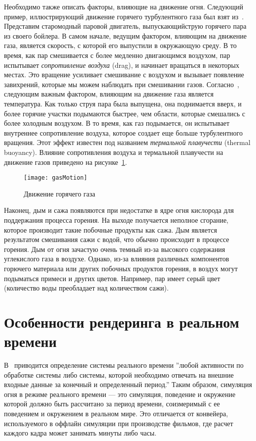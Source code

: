 Необходимо также описать факторы, влияющие на движение огня. Следующий пример,
иллюстрирующий движение горячего турбулентного газа был взят
из~\cite{Foster1997ModelingTM}. Представим старомодный паровой двигатель,
выпускающий\break{}струю горячего пара из своего бойлера. В самом начале,
ведущим фактором, влияющим на движение газа, является скорость, с которой его
выпустили в окружающую среду. В то время, как пар смешивается с более медленно
двигающимся воздухом, пар испытывает \emph{сопротивление воздуха} (drag), и
начинает вращаться в некоторых местах. Это вращение усиливает смешивание с
воздухом и вызывает появление завихрений, которые мы можем наблюдать при
смешивании газов.  Согласно~\cite{Foster1997ModelingTM}, следующим важным
фактором, влияющим на движение газа является температура. Как только струя пара
была выпущена, она поднимается вверх, и более горячие участки подымаются
быстрее, чем области, которые смешались с более холодным воздухом. В то время,
как газ подымается, он испытывает внутреннее сопротивление воздуха, которое
создает еще больше турбулентного вращения. Этот эффект известен под названием
\emph{термальной плавучести} (thermal buoyancy). Влияние сопротивления воздуха и
термальной плавучести на движение газов приведено на
рисунке~\ref{fig:gasMotion}.
\begin{figure}[htb]
	\centering
    \texttt{[image: gasMotion]}
	\caption{Движение горячего газа}%
    \label{fig:gasMotion}
\end{figure}

Наконец, дым и сажа появляются при недостатке в ядре огня кислорода для
поддержания процесса горения. На выходе получается неполное сгорание, которое
производит такие побочные продукты как сажа. Дым является результатом смешивания
сажи с водой, что обычно происходит в процессе горения. Дым от огня зачастую
очень темный из-за высокого содержания углекислого газа в воздухе. Однако, из-за
влияния различных компонентов горючего материала или других побочных продуктов
горения, в воздух могут подыматься примеси и других цветов. Например, пар имеет
серый цвет (количество воды преобладает над количеством сажи).

\section{Особенности рендеринга в реальном времени}

В~\cite{Young1982RealTL} приводится определение системы реального времени
''любой активности по обработке системы либо системы, которой необходимо
отвечать на внешние входные данные за конечный и определенный период.'' Таким
образом, симуляция огня в режиме реального времени --- это симуляция, поведение
и окружение которой должно быть рассчитано за период времени, соизмеримый с ее
поведением и окружением в реальном мире. Это отличается от конвейера,
используемого в оффлайн симуляции при производстве фильмов, где расчет каждого
кадра может занимать минуты либо часы.

